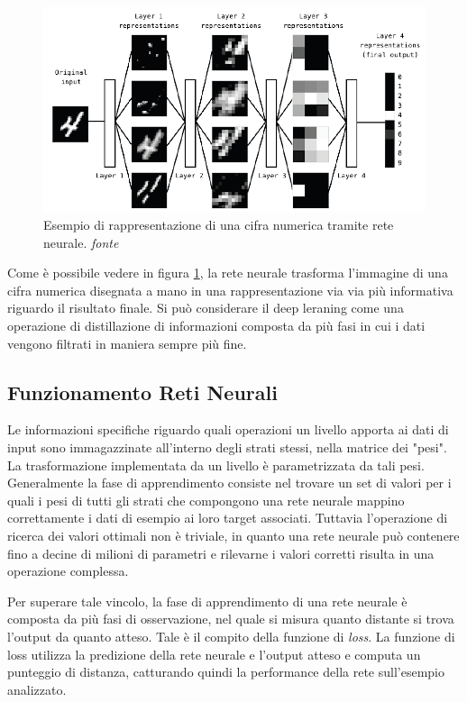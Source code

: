 \begin{figure}[!bp]
	\centering
	\includegraphics[width=\columnwidth]{figures/deeplearning.png}
	\caption{Esempio di rappresentazione di una cifra numerica tramite rete neurale. \textit{fonte}%
	 \cite{chollet2017deep} \label{fig:neuralnetwork} }
\end{figure}

Come è possibile vedere in figura \ref{fig:neuralnetwork}, la rete neurale trasforma l'immagine di una cifra numerica disegnata a mano in una rappresentazione via via più informativa riguardo il risultato finale. Si può considerare il deep leraning come una operazione di distillazione di informazioni composta da più fasi in cui i dati vengono filtrati in maniera sempre più fine.

\subsection{Funzionamento Reti Neurali}
Le informazioni specifiche riguardo quali operazioni un livello apporta ai dati di input sono immagazzinate all'interno degli strati stessi, nella matrice dei "pesi". La trasformazione implementata da un livello è parametrizzata da tali pesi. Generalmente la fase di apprendimento consiste nel trovare un set di valori per i quali i pesi di tutti gli strati che compongono una rete neurale mappino correttamente i dati di esempio ai loro target associati.
Tuttavia l'operazione di ricerca dei valori ottimali non è triviale, in quanto una rete neurale può contenere fino a decine di milioni di parametri e rilevarne i valori corretti risulta in una operazione complessa.

Per superare tale vincolo, la fase di apprendimento di una rete neurale è composta da più fasi di osservazione, nel quale si misura quanto distante si trova l'output da quanto atteso. Tale è il compito della funzione di \textit{loss}. La funzione di loss utilizza la predizione della rete neurale e l'output atteso e computa un punteggio di distanza, catturando quindi la performance della rete sull'esempio analizzato.

